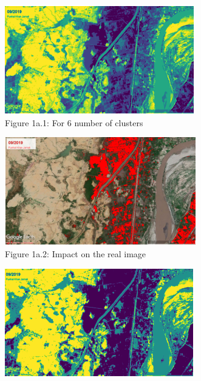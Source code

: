 \documentclass[12pt,a4paper,IEEEtran]{article}
\begin{document}
\begin{figure}[ht]
    \centering
    \begin{subfigure}{0.45\textwidth}
        \includegraphics[width=\linewidth]{fig1a.PNG} %
        \caption{Figure 1a.1: For 6 number of clusters}
        \label{fig:subfig1}
    \end{subfigure}
    \hfill
    \begin{subfigure}{0.45\textwidth}
        \includegraphics[width=\linewidth]{fig1a_ans.PNG} %
        \caption{Figure 1a.2: Impact on the real image}
        \label{fig:subfig2}
    \end{subfigure}
	\hfill
	\begin{subfigure}{0.45\textwidth}
        \includegraphics[width=\linewidth]{fig1b.PNG} %

\end{subfigure}
\end{figure}
\end{document}
